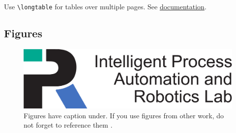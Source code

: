 Use \texttt{\textbackslash longtable} for tables over multiple pages. See \href{https://de.wikibooks.org/wiki/LaTeX-W%C3%B6rterbuch:_longtable_(Umgebung)}{documentation}.

\subsection{Figures}
\begin{figure}[H]
    \centering
    \includegraphics[width=0.8\columnwidth]{Logos/KIT-Departments/IPRLogo_en}
    \caption{Figures have caption under. If you use figures from other work, do not forget to reference them \cite{deininger2005studien}.}
    \label{fig:figure_caption}
\end{figure}

